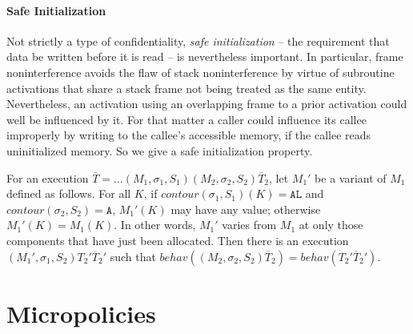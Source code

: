 \documentclass{article}
\begin{document}
    \paragraph{Safe Initialization}

      Not strictly a type of confidentiality, {\it safe initialization} -- the requirement that data be
      written before it is read -- is nevertheless important. In particular, frame noninterference avoids
      the flaw of stack noninterference by virtue of subroutine activations that share a stack frame not
      being treated as the same entity. Nevertheless, an activation using an overlapping frame to a prior
      activation could well be influenced by it. For that matter a caller could influence its callee
      improperly by writing to the callee's accessible memory, if the callee reads uninitialized memory.
      So we give a safe initialization property.

      For an execution \(\overline{T} = \dots (M_1,\sigma_1,S_1) (M_2,\sigma_2,S_2) \overline{T}_2\), let \(M_1'\)
      be a variant of \(M_1\) defined as follows. For all \(K\), if \(\mathit{contour}(\sigma_1,S_1)(K) =
      \mathtt{AL}\) and \(\mathit{contour}(\sigma_2,S_2) = \mathtt{A}\), \(M_1'(K)\) may have any value;
      otherwise \(M_1'(K) = M_1(K)\). In other words, \(M_1'\) varies from \(M_1\) at only those components
      that have just been allocated. Then there is an execution \((M_1',\sigma_1,S_2) T_2' \overline{T}_2'\)
      such that \(\mathit{behav}((M_2,\sigma_2,S_2) \overline{T}_2) = \mathit{behav}(T_2' \overline{T}_2')\).




  \section{Micropolicies}
    \label{sec:pols}
\end{document}
